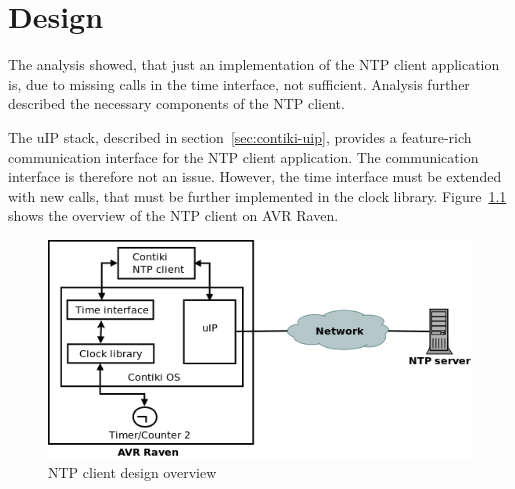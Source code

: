 
\chapter{Design}
The analysis showed, that just an implementation of the
NTP client application is, due to missing calls in the time interface, not sufficient.
Analysis further described the necessary components of the NTP client.

The uIP stack, described in section~\ref{sec:contiki-uip}, provides a feature-rich
communication interface for the NTP client application.
The communication interface is therefore not an issue.
However, the time interface must be extended with new calls,
that must be further implemented in the clock library.
Figure~\ref{fig:design-overview} shows the overview of the NTP client on AVR Raven.

\begin{figure}[H]
  \centering
  \includegraphics[width=13cm,keepaspectratio]{fig/design.png}
  \caption{NTP client design overview}
  \label{fig:design-overview}
\end{figure}






